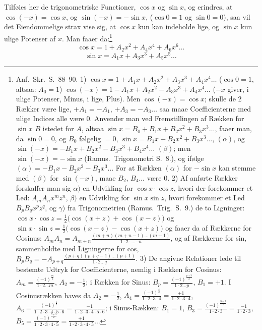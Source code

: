 \documentclass[12pt]{book}
\begin{document}
Tilføies her de trigonometriske Functioner, $\cos x$ og $\sin x$, og erindres, at
$\cos(-x) = \cos x$, og $\sin(-x) = -\sin x$, ($\cos 0 = 1$ og $\sin 0 = 0$), saa
vil det Eiendommelige strax vise sig, at $\cos x$ kun kan indeholde lige, og
$\sin x$ kun ulige Potenser af $x$. Man faaer da:\footnote{Anf.\ Skr.\ S.\
88--90.
1) $\cos x = 1 + A_1 x + A_2 x^{2} + A_3 x^{3} + A_4 x^{4}\dots$ ($\cos 0 = 1$,
altsaa: $A_0 = 1$)
$\cos(-x) = 1 - A_1 x + A_2 x^{2} - A_3 x^{3} + A_4 x^{4}\dots$ ($-x$ giver, i
ulige Potenser, Minus, i lige, Plus).
Men $\cos(-x) = \cos x$; skulle de 2 Rækker være lige, $+A_1 = -A_1$,
$+A_3 = -A_3\dots$ saa maae Coefficienterne med ulige Indices alle være 0.
Anvender man ved Fremstillingen af Rækken for $\sin x$ $B$ istedet for $A$,
altsaa $\sin x = B_0 + B_1 x + B_2 x^{2} + B_3 x^{3}\dots$, faaer man, da
$\sin 0 = 0$, og $B_0$ følgelig $= 0$, $\sin x = B_1 x + B_2 x^{2} +
B_3 x^{3}\dots$, $(\alpha)$, og $\sin(-x) = -B_1 x + B_2 x^{2} - B_3 x^{3} +
B_4 x^{4}\dots$ $(\beta)$; men $\sin(-x) = -\sin x$ (Ramus.\ Trigonometri S.\
8.), og ifølge $(\alpha) = -B_1 x - B_2 x^{2} - B_3 x^{3}\dots$ For at Rækken
$(\alpha)$ for $-\sin x$ kan stemme med $(\beta)$ for $\sin(-x)$, maae $B_2$,
$B_4\dots$ være 0.
2) Af anførte Rækker forskaffer man sig $\alpha)$ en Udvikling for
$\cos x\cdot\cos z$, hvori der forekommer et Led: $A_m A_n x^{m}z^{n}$,
$\beta)$ en Udvikling for $\sin x\sin z$, hvori forekommer et Led
$B_p B_q x^{p}z^{q}$, og $\gamma)$ fra Trigonometrien (Ramus.\ Trig.\ S.\ 9.) de
to Ligninger: $\cos x\cdot\cos z = \frac{1}{2}\big(\cos(x+z) + \cos(x-z)\big)$ og
$\sin x\cdot\sin z = \frac{1}{2}\big(\cos(x-z) - \cos(x+z)\big)$ og faaer da af
Rækkerne for Cosinus: $A_m A_n = A_{m+n}\frac{(m+n)(m+n-1)\dots(m+1)}{1\cdot
2\cdot\dots\cdot n}$, og af Rækkerne for sin, sammenholdte med Ligningerne for
cos, $B_p B_q = -A_{p+q}\frac{(p+q)(p+q-1)\dots(p+1)}{1\cdot 2\dots q}$.
3) De angivne Relationer lede til bestemte Udtryk for Coefficienterne, nemlig i
Rækken for Cosinus: $A_m = \frac{(-1)^{\frac{m}{2}}}{1\cdot 2\dots m}$,
$A_2 = -\frac{1}{2}$; i Rækken for Sinus: $B_p =
\frac{(-1)^{\frac{p+3}{2}}}{1\cdot 2\dots p}$, $B_1 = +1$. I Cosinusrækken haves
da $A_2 = -\frac{1}{2}$, $A_4 = \frac{(-1)^{\frac{4}{2}}}{1\cdot 2\cdot 3\cdot 4}
= \frac{+1}{1\cdot 2\cdot 3\cdot 4}$, $A_6 = \frac{(-1)^{\frac{6}{2}}}{1\cdot
2\cdot 3\cdot 4\cdot 5\cdot 6} = \frac{-1}{1\cdot 2\cdot 3\cdot 4\cdot 5\cdot 6}$;
i Sinus-Rækken: $B_1 = 1$, $B_3 = \frac{(-1)^{\frac{3+3}{2}}}{1\cdot 2\cdot 3} =
\frac{-1}{1\cdot 2\cdot 3}$, $B_5 = \frac{(-1)^{\frac{5+3}{2}}}{1\cdot 2\cdot
3\cdot 4\cdot 5} = \frac{+1}{1\cdot 2\cdot 3\cdot 4\cdot 5}\dots$}
\[
\cos x = 1 + A_2 x^{2} + A_4 x^{4} + A_6 x^{6}\dots
\]
\[
\sin x = A_1 x + A_3 x^{3} + A_5 x^{5}\dots
\]
\end{document}
